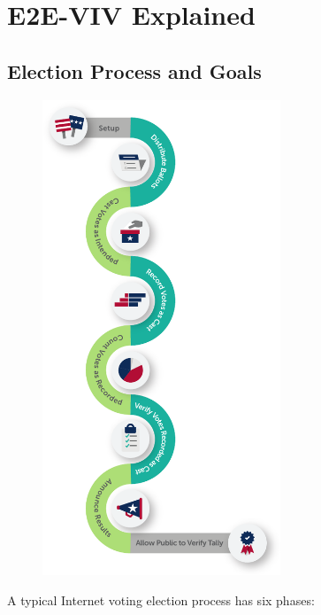 \chapter{E2E-VIV Explained}
\label{chapter:e2e_viv_explained}

\section{Election Process and Goals}
\begin{figure}
\vspace*{-4ex}
\begin{center}
\includegraphics[width=2.8in]{e2e_viv_explained_resources/process.pdf}
\end{center}
\label{fig:e2eviv_process_illustrated}
\end{figure}
A typical Internet voting election process has six phases:

